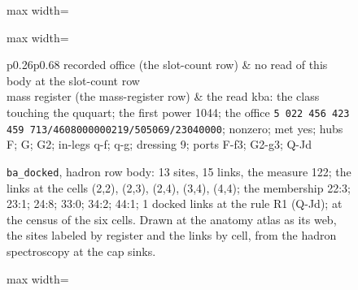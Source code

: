 \begin{chconditional}
\begin{figure}[H]
\begin{adjustbox}{max width=\linewidth}
\end{adjustbox}
\caption{\texttt{ba\_docked}, hadron row body: 13 sites, 15 links, the measure 122; the links at the cells (2,2), (2,3), (2,4), (3,4), (4,4); the membership 22:3; 23:1; 24:8; 33:0; 34:2; 44:1; 1 docked links at the rule R1 (Q-Jd); at the census of the six cells. Drawn at the anatomy atlas as its web, the sites labeled by register and the links by cell, from the hadron spectroscopy at the cap sinks.}\label{fig:VII-6-D540002-ba-docked-7309c8}
\begin{center}\footnotesize\begin{adjustbox}{max width=\linewidth}\begin{tabular}{p{0.26\textwidth}p{0.68\textwidth}}\toprule
recorded office (the slot-count row) & no read of this body at the slot-count row \\
mass register (the mass-register row) & the read kba: the class touching the ququart; the first power 1044; the office \texttt{5 022 456 423 459 713/4608000000\textbar{}219/50\textbar{}5069/2304000\textbar{}0}; nonzero; met yes; hubs F; G; G2; in-legs q-f; q-g; dressing 9; ports F-f3; G2-g3; Q-Jd \\
\bottomrule\end{tabular}\end{adjustbox}\end{center}
\end{figure}
\begin{figure}[H]\centering
\begin{adjustbox}{max width=\linewidth}
\end{adjustbox}
\end{figure}
\end{chconditional}
